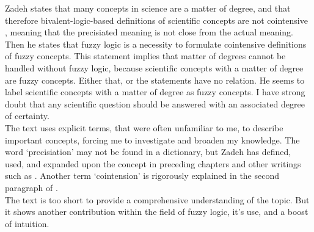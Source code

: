 Zadeh states that many concepts in science are a matter of degree, and that therefore bivalent-logic-based definitions of scientific concepts are not cointensive \cite[2769]{is_there_a_need_for_fuzzy_logic}, meaning that the precisiated meaning is not close from the actual meaning. Then he states that fuzzy logic is a necessity to formulate cointensive definitions of fuzzy concepts. This statement implies that matter of degrees cannot be handled without fuzzy logic, because scientific concepts with a matter of degree are fuzzy concepts. Either that, or the statements have no relation. He seems to label scientific concepts with a matter of degree as fuzzy concepts. I have strong doubt that any scientific question should be answered with an associated degree of certainty. \\

The text uses explicit terms, that were often unfamiliar to me, to describe important concepts, forcing me to investigate and broaden my knowledge. The word `precisiation' may not be found in a dictionary, but Zadeh has defined, used, and expanded upon the concept in preceding chapters and other writings such as \cite{concept_of_cointensive_precisiation}. Another term `cointension' is rigorously explained in the second paragraph of \cite[2760]{is_there_a_need_for_fuzzy_logic}. \\

The text is too short to provide a comprehensive understanding of the topic. But it shows another contribution within the field of fuzzy logic, it's use, and a boost of intuition.
